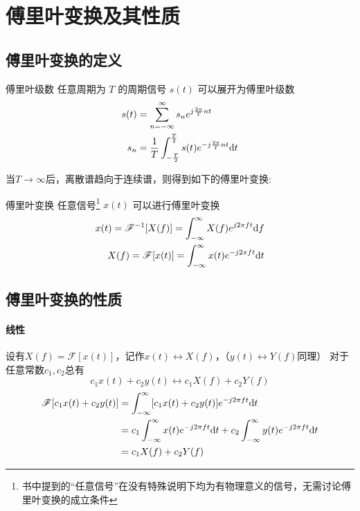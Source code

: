 \section{傅里叶变换及其性质}\label{appendix:I}
\subsection{傅里叶变换的定义}
    \begin{mydef}{傅里叶级数}\label{def:fs}
    任意周期为 $T$ 的周期信号 $s(t)$ 可以展开为傅里叶级数
    \begin{equation}
        \begin{split}
            s(t) &= \sum_{n=-\infty}^{\infty}s_ne^{j\frac{2\pi}{T}nt}\\
            s_n  &= \frac{1}{T}\int_{-\frac{T}{2}}^{\frac{T}{2}}s(t)e^{-j\frac{2\pi}{T}nt}\text{\upshape d} t
        \end{split}
    \end{equation}
    \end{mydef}
    当$T\to\infty$后，离散谱趋向于连续谱，则得到如下的傅里叶变换:
    \begin{mydef}{傅里叶变换}\label{def:ft}
    任意信号\footnote{书中提到的“任意信号”在没有特殊说明下均为有物理意义的信号，无需讨论傅里叶变换的成立条件}
    $x(t)$ 可以进行傅里叶变换
    \begin{equation}
        \begin{split}
            x(t) =\mathscr{F}^{-1} [X(f)]=\int_{-\infty}^{\infty}X(f)e^{j2\pi ft}\text{\upshape d} f\\
            X(f) =\mathscr{F}      [x(t)]=\int_{-\infty}^{\infty}x(t)e^{-j2\pi ft}\text{\upshape d} t
        \end{split}
    \end{equation}
    \end{mydef}
    \subsection{傅里叶变换的性质}
    \paragraph{线性}
    设有$X(f)=\mathscr{F}[x(t)]$，记作$x(t)\leftrightarrow X(f)$，（$y(t)\leftrightarrow Y(f)$同理）
        对于任意常数$c_1,c_2$总有
        \begin{equation}
            c_1x(t)+c_2y(t)\leftrightarrow c_1X(f)+c_2Y(f)
        \end{equation}
        \Proof
        \begin{equation*}
            \begin{split}
                \mathscr{F}[c_1x(t)+c_2y(t)] &=\int_{-\infty}^{\infty} [c_1x(t)+c_2y(t)]e^{-j2\pi ft}\text{\upshape d} t\\
                                             &=c_1\int_{-\infty}^{\infty}x(t)e^{-j2\pi ft}\text{\upshape d} t+c_2\int_{-\infty}^{\infty}y(t)e^{-j2\pi ft}\text{\upshape d} t\\
                                             &=c_1X(f)+c_2Y(f)
            \end{split}
        \end{equation*}

